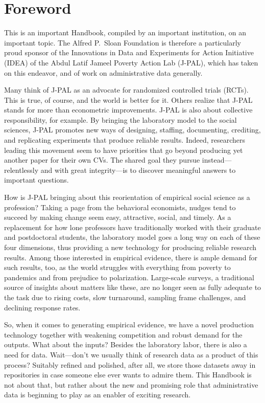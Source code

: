 \newpage\hypertarget{foreword}{%
\chapter*{Foreword}\label{foreword}}

This is an important Handbook, compiled by an important institution, on an important topic. The Alfred P.\ Sloan Foundation is therefore a particularly proud sponsor of the Innovations in Data and Experiments for Action Initiative (IDEA) of the Abdul Latif Jameel Poverty Action Lab (J-PAL), which has taken on this endeavor, and of work on administrative data generally.

Many think of J-PAL as an advocate for randomized controlled trials (RCTs). This is true, of course, and the world is better for it. Others realize that J-PAL stands for more than econometric improvements. J-PAL is also about collective responsibility, for example. By bringing the laboratory model to the social sciences, J-PAL promotes new ways of designing, staffing, documenting, crediting, and replicating experiments that produce reliable results. Indeed, researchers leading this movement seem to have priorities that go beyond producing yet another paper for their own CVs. The shared goal they pursue instead---relentlessly and with great integrity---is to discover meaningful answers to important questions.

How is J-PAL bringing about this reorientation of empirical social science as a profession? Taking a page from the behavioral economists, nudges tend to succeed by making change seem easy, attractive, social, and timely. As a replacement for how lone professors have traditionally worked with their graduate and postdoctoral students, the laboratory model goes a long way on each of these four dimensions, thus providing a new technology for producing reliable research results. Among those interested in empirical evidence, there is ample demand for such results, too, as the world struggles with everything from poverty to pandemics and from prejudice to polarization. Large-scale surveys, a traditional source of insights about matters like these, are no longer seen as fully adequate to the task due to rising costs, slow turnaround, sampling frame challenges, and declining response rates.

So, when it comes to generating empirical evidence, we have a novel production technology together with weakening competition and robust demand for the outputs. What about the inputs? Besides the laboratory labor, there is also a need for data. Wait---don't we usually think of research data as a product of this process? Suitably refined and polished, after all, we store those datasets away in repositories in case someone else ever wants to admire them. This Handbook is not about that, but rather about the new and promising role that administrative data is beginning to play as an enabler of exciting research.

